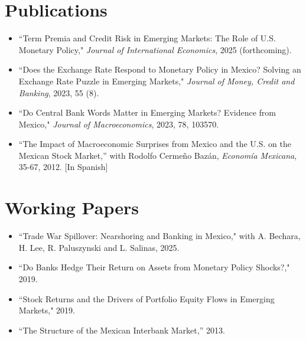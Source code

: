 \documentclass[12pt]{article}
\newcommand{\vsect}{\vspace{0.08cm}}
\begin{document}
	
	\section{Publications} 
	\vsect
	\begin{itemize}[label={},itemindent=-2em,leftmargin=2em,noitemsep,topsep=0pt]
		\item ``Term Premia and Credit Risk in Emerging Markets: The Role of U.S. Monetary Policy," \textit{Journal of International Economics}, 2025 (forthcoming).
		\item ``Does the Exchange Rate Respond to Monetary Policy in Mexico? Solving an Exchange Rate Puzzle in Emerging Markets," \textit{Journal of Money, Credit and Banking}, 2023, 55 (8). %
		\item ``Do Central Bank Words Matter in Emerging Markets? Evidence from Mexico," \textit{Journal of Macroeconomics}, 2023, 78, 103570.
		\item ``The Impact of Macroeconomic Surprises from Mexico and the U.S. on the Mexican Stock Market,” with Rodolfo Cermeño Bazán, \textit{Economía Mexicana}, 35-67, 2012. [In Spanish]
	\end{itemize}
	
	
	\section{Working Papers}
	\vsect
	\begin{itemize}[label={},itemindent=-2em,leftmargin=2em,noitemsep,topsep=0pt]
	\item ``Trade War Spillover: Nearshoring and Banking in Mexico," with A. Bechara, H. Lee, R. Paluszynski and L. Salinas, 2025.
	\item ``Do Banks Hedge Their Return on Assets from Monetary Policy Shocks?," 2019.
	\item ``Stock Returns and the Drivers of Portfolio Equity Flows in Emerging Markets," 2019.
	\item ``The Structure of the Mexican Interbank Market,” 2013.
	\end{itemize}
	
	\pagestyle{fancy}
	
\end{document}

